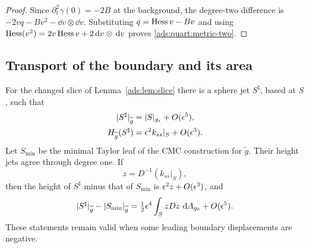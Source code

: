 \begin{proof}
Since \(\partial_t^2\gamma(0)=-2B\) at the background, the
degree-two difference is
\(-2vq-Bv^2-\dd v\otimes\dd v\).  Substituting
\(q=\operatorname{Hess} v-Bv\) and using
\(\operatorname{Hess}(v^2)=2v\operatorname{Hess} v+2\,\mathrm d v\otimes\,\mathrm d v\) proves
\eqref{ads:quart:metric-two}.
\end{proof}

\subsection{Transport of the boundary and its area}

\begin{lemma}
\label{ads:lem:null-cut}
For the changed slice of Lemma~\ref{ads:lem:slice} there is a sphere jet
\(S^\sharp\), based at \(S\), such that
\begin{align}
 |S^\sharp|_{\widetilde g}&=|S|_{g_\epsilon}+O(\epsilon^5),
 \label{ads:quart:null-area}\\
 H_{\widetilde g}(S^\sharp)
      &=\epsilon^2k_{ss}|_S+O(\epsilon^3).
 \label{ads:quart:null-h}
\end{align}
Let \(S_{\min}\) be the minimal Taylor leaf of the CMC construction
for \(\widetilde g\).  Their height jets agree through degree one.  If
\begin{equation}
 z=D^{-1}(k_{ss}|_S),
 \label{ads:quart:z}
\end{equation}
then the height of \(S^\sharp\) minus that of \(S_{\min}\) is
\(\epsilon^2z+O(\epsilon^3)\), and
\begin{equation}
 |S^\sharp|_{\widetilde g}-|S_{\min}|_{\widetilde g}
     =\tfrac12\epsilon^4\int_S zDz\,\,\mathrm d A_{g_0}+O(\epsilon^5).
 \label{ads:quart:area-hessian}
\end{equation}
These statements remain valid when some leading boundary
displacements are negative.
\end{lemma}

